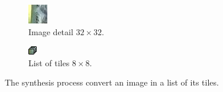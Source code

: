 \begin{figure}[ht]
    \centering
    \begin{subfigure}{0.4\linewidth}
        \includegraphics[width=\linewidth]{Figures/example_detail.png}
        \caption{Image detail $32 \times 32$.}
    \end{subfigure}
    \hspace{2cm}
    \begin{subfigure}{0.4\linewidth}
        \includegraphics[width=\linewidth]{Figures/example_tiles.png}
        \caption{List of tiles $8 \times 8$.}
    \end{subfigure}
    \caption[Illustration of synthesis process]{The synthesis process convert an image in a list of its tiles.}
    \label{fig:puffer_tiles}
\end{figure}

